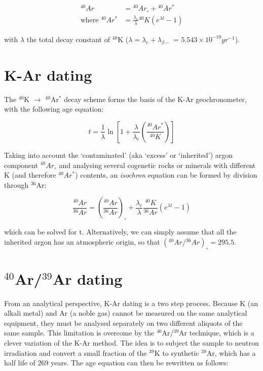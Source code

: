 \documentclass{book}
\begin{document}
\begin{equation}
\begin{array}{rl}
^{40}Ar & = {}^{40}Ar_\circ + {}^{40}Ar^*\\ 
\mbox{where~} {}^{40}Ar^* & =
  \frac{\lambda_e}{\lambda} {}^{40}K \left( e^{\lambda t} - 1 \right)
\end{array}
\label{eq:Ar}
\end{equation}

with $\lambda$ the total decay constant of $^{40}$K ($\lambda =
\lambda_e + \lambda_{\beta-}$ = $5.543 \times 10^{-10} yr^{-1}$).

\section{K-Ar dating}

The $^{40}$K $\rightarrow$ $^{40}$Ar$^*$ decay scheme forms the basis
of the K-Ar geochronometer, with the following age equation:

\begin{equation}
t = \frac{1}{\lambda} \ln\left[ 1 + \frac{\lambda}{\lambda_e}
  \left(\frac{^{40}Ar^*}{^{40}K}\right) \right]
\label{eq:K-Ar}
\end{equation}

Taking into account the `contaminated' (aka `excess' or `inherited')
argon component $^{40}Ar_\circ$ and analysing several cogenetic rocks
or minerals with different K (and therefore $^{40}Ar^*$) contents, an
\emph{isochron} equation can be formed by division through $^{36}$Ar:

\begin{equation}
\frac{^{40}Ar}{^{36}Ar} = \left(\frac{^{40}Ar}{^{36}Ar}\right)_\circ +
\frac{\lambda_e}{\lambda} \frac{^{40}K}{^{36}Ar} \left( e^{\lambda t} - 1 \right)
\label{eq:K-Ar-isochron}
\end{equation}

which can be solved for t. Alternatively, we can simply assume that
all the inherited argon has an atmospheric origin, so that
$({}^{40}Ar/{}^{36}Ar)_\circ = 295.5$.

\section{$^{40}$Ar/$^{39}$Ar dating}
\label{sec:Ar-Ar}

From an analytical perspective, K-Ar dating is a two step
process. Because K (an alkali metal) and Ar (a noble gas) cannot be
measured on the same analytical equipment, they must be analysed
separately on two different aliquots of the same sample.  This
limitation is overcome by the $^{40}$Ar/$^{39}$Ar technique, which is
a clever variation of the K-Ar method. The idea is to subject the
sample to neutron irradiation and convert a small fraction of the
$^{39}$K to synthetic $^{39}$Ar, which has a half life of 269
years. The age equation can then be rewritten as follows:
\end{document}
